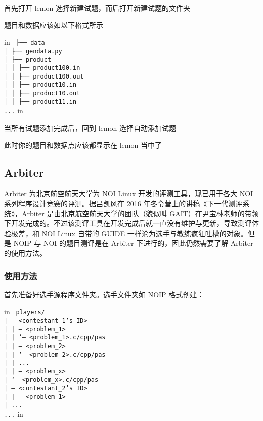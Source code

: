 首先打开 lemon 选择新建试题，而后打开新建试题的文件夹

题目和数据应该如以下格式所示

 in
\texttt{
├── data\\│   ├── gendata.py\\│   ├── product\\│   │   ├── product100.in\\│   │   ├── product100.out\\│   │   ├── product10.in\\│   │   ├── product10.out\\│   │   ├── product11.in\\...}
 in

当所有试题添加完成后，回到 lemon 选择自动添加试题

此时你的题目和数据点应该都显示在 lemon 当中了

\subsection{Arbiter}

Arbiter 为北京航空航天大学为 NOI Linux 开发的评测工具，现已用于各大 NOI 系列程序设计竞赛的评测。据吕凯风在 2016 年冬令营上的讲稿《下一代测评系统》，Arbiter 是由北京航空航天大学的团队（貌似叫 GAIT）在尹宝林老师的带领下开发完成的。不过该测评工具在开发完成后就一直没有维护与更新，导致测评体验极差，和 NOI Linux 自带的 GUIDE 一样沦为选手与教练疯狂吐槽的对象。但是 NOIP 与 NOI 的题目测评是在 Arbiter 下进行的，因此仍然需要了解 Arbiter 的使用方法。

\subsubsection{使用方法}

首先准备好选手源程序文件夹。选手文件夹如 NOIP 格式创建：

 in
\texttt{
players/\\| -- <contestant_1's ID>\\|     | -- <problem_1>\\|     |   `-- <problem_1>.c/cpp/pas\\|     | -- <problem_2>\\|     |   `-- <problem_2>.c/cpp/pas\\|     | ...\\|     | -- <problem_x>\\|        `-- <problem_x>.c/cpp/pas\\| -- <contestant_2's ID>\\|     | -- <problem_1>\\|     ...\\...}
 in

